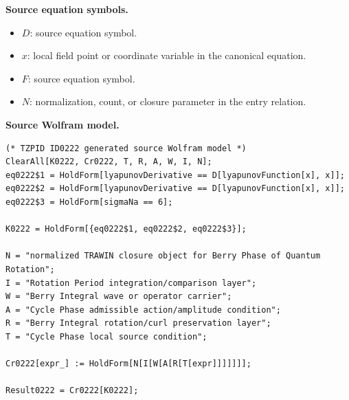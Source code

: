 \begin{minipage}[t]{0.49\linewidth}
\begingroup
\small
\raggedright
\textbf{Source equation symbols.}\par
\begin{itemize}[leftmargin=1.35em,itemsep=1pt,topsep=1pt,parsep=0pt]
    \item $D$: source equation symbol.
    \item $x$: local field point or coordinate variable in the canonical equation.
    \item $F$: source equation symbol.
    \item $N$: normalization, count, or closure parameter in the entry relation.
\end{itemize}
\endgroup
\end{minipage}\hfill
\begin{minipage}[t]{0.47\linewidth}
\begingroup
\scriptsize
\raggedright
\textbf{Source Wolfram model.}\par
\begin{Verbatim}[fontsize=\tiny,breaklines=true,breakanywhere=true]
(* TZPID ID0222 generated source Wolfram model *)
ClearAll[K0222, Cr0222, T, R, A, W, I, N];
eq0222$1 = HoldForm[lyapunovDerivative == D[lyapunovFunction[x], x]];
eq0222$2 = HoldForm[lyapunovDerivative == D[lyapunovFunction[x], x]];
eq0222$3 = HoldForm[sigmaNa == 6];

K0222 = HoldForm[{eq0222$1, eq0222$2, eq0222$3}];

N = "normalized TRAWIN closure object for Berry Phase of Quantum Rotation";
I = "Rotation Period integration/comparison layer";
W = "Berry Integral wave or operator carrier";
A = "Cycle Phase admissible action/amplitude condition";
R = "Berry Integral rotation/curl preservation layer";
T = "Cycle Phase local source condition";

Cr0222[expr_] := HoldForm[N[I[W[A[R[T[expr]]]]]]];

Result0222 = Cr0222[K0222];
\end{Verbatim}
\endgroup
\end{minipage}

